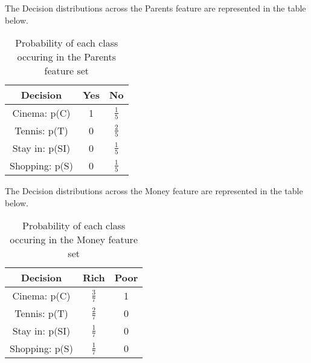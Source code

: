 \documentclass[10pt]{article}
\begin{document}
The Decision distributions across the Parents feature are represented in the table below.
\begin{table}[H]
    \centering
    \renewcommand{\arraystretch}{1.5}
    \begin{tabular}{|c|c|c|}
    \hline
    \textbf{Decision} & \textbf{Yes} & \textbf{No} \\ \hline
    Cinema: p(C) & 1 & $\frac{1}{5}$ \\ \hline
    Tennis: p(T) & 0 & $\frac{2}{5}$ \\ \hline
    Stay in: p(SI) & 0 & $\frac{1}{5}$ \\ \hline
    Shopping: p(S) & 0 & $\frac{1}{5}$ \\ \hline
    \end{tabular}
    \caption{Probability of each class occuring in the Parents feature set}
    \label{Parents}
\end{table}
The Decision distributions across the Money feature are represented in the table below.
\begin{table}[H]
    \centering
    \renewcommand{\arraystretch}{1.5}
    \begin{tabular}{|c|c|c|}
    \hline
    \textbf{Decision} & \textbf{Rich} & \textbf{Poor} \\ \hline
    Cinema: p(C) & $\frac{3}{7}$ & 1 \\ \hline
    Tennis: p(T) & $\frac{2}{7}$ & 0 \\ \hline
    Stay in: p(SI) & $\frac{1}{7}$ & 0 \\ \hline
    Shopping: p(S) & $\frac{1}{7}$ & 0 \\ \hline
    \end{tabular}
    \caption{Probability of each class occuring in the Money feature set}
    \label{money}
\end{table}
\end{document}
